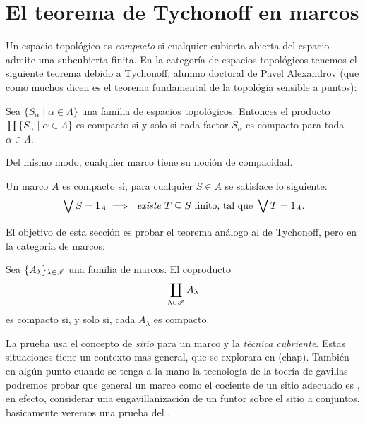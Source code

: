 \section{El teorema de Tychonoff en marcos}

Un espacio topológico es  \emph{compacto} si cualquier cubierta
abierta del espacio admite una subcubierta finita.
En la categoría de espacios topológicos tenemos el siguiente 
teorema debido a Tychonoff, alumno doctoral de Pavel Alexandrov (que
como muchos dicen es el teorema fundamental de la topológia sensible a
puntos):

\begin{theorem}
  Sea $\{S_{\alpha}\mid\alpha\in\Lambda\}$ una familia de espacios topológicos. Entonces
  el producto $\prod\{S_{\alpha}\mid\alpha\in\Lambda\}$ es compacto si
  y solo si cada factor $S_{\alpha}$ es compacto para toda
  $\alpha\in\Lambda$.
\end{theorem}

Del mismo modo, cualquier marco tiene su noción de compacidad.
\begin{definition}
Un marco $A$ es compacto si, para cualquier $S\in A$
se satisface lo siguiente:
\[
    \bigvee S= 1_A
    \implies
    \textit{ existe } T\subseteq S\text{ finito, tal que }
    \bigvee T= 1_A
.\]
\end{definition}
El objetivo de esta sección es probar el teorema análogo
al de Tychonoff, pero en la categoría de marcos:
\begin{theorem}
    Sea $\{A_\lambda\}_{\lambda\in\mathscr{I}}$ una familia de marcos.
    El coproducto
    \[
        \coprod_{\lambda\in\mathscr{I}}A_\lambda
    \]
    es compacto si, y solo si, cada $A_\lambda$ es compacto.
\end{theorem}

La prueba usa el concepto de \emph{sitio} para un marco y la
\emph{técnica cubriente}. Estas situaciones tiene un contexto mas
general, que se explorara en (chap). También
en algún punto cuando se tenga a la mano la tecnología de la toería de
gavillas podremos probar que general un marco como el cociente de un
sitio adecuado es , en efecto, considerar una engavillanización de un
funtor sobre el sitio a conjuntos, basicamente veremos una prueba del
\cite[Lemma V.1.7]{johnstone1986stone}.

